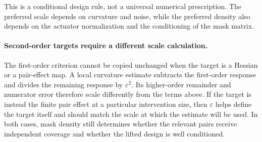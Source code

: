 \documentclass[sigconf,10pt,nonacm,balance=false]{acmart}
\newcommand{\eps}{\varepsilon}
\begin{document}
This is a conditional design rule, not a universal numerical prescription. The preferred scale depends on curvature and noise, while the preferred density also depends on the actuator normalization and the conditioning of the mask matrix.

\paragraph{Second-order targets require a different scale calculation.}
The first-order criterion cannot be copied unchanged when the target is a Hessian or a pair-effect map. A local curvature estimate subtracts the first-order response and divides the remaining response by $\eps^2$. Its higher-order remainder and numerator error therefore scale differently from the terms above. If the target is instead the finite pair effect at a particular intervention size, then $\eps$ helps define the target itself and should match the scale at which the estimate will be used. In both cases, mask density still determines whether the relevant pairs receive independent coverage and whether the lifted design is well conditioned.
\end{document}
